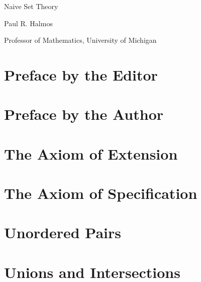 \documentclass[fontsize=12pt,b5paper,
pagesize=auto]{book}
\theoremstyle{axiom}
\theoremstyle{exc}
\begin{document}
\frontmatter

\begin{titlepage}
 \vspace*{1cm}
 {\huge\raggedright Naive Set Theory\par}
 \noindent\hrulefill\par
 {\LARGE\raggedleft Paul R. Halmos\textsuperscript{\textdagger}\par}
 \vfill
 {\Large\raggedright\textsuperscript{\textdagger}Professor of Mathematics, University of Michigan\par}
\end{titlepage}

\setlength{\headheight}{14.49998pt}
\setlength{\parindent}{0.75\parindent}

\chapter*{Preface by the Editor} 


\chapter*{Preface by the Author} 


\clearpage{}
{}
\setlength{\cftparskip}{-10pt}
\scshape
\tableofcontents
\upshape

\mainmatter

\chapter{The Axiom of Extension}


\chapter{The Axiom of Specification}


\chapter{Unordered Pairs}


\chapter{Unions and Intersections}

\end{document}
